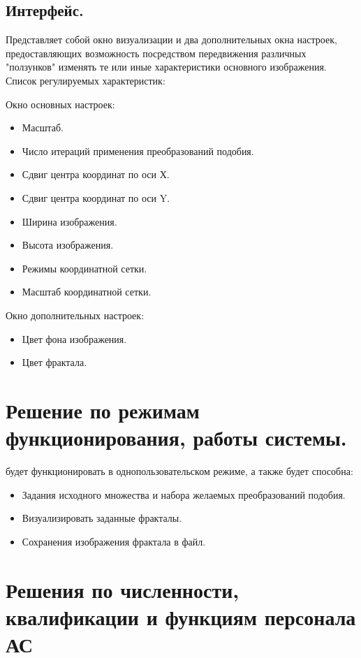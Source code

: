 \documentclass[a4paper,12pt,preview]{report} %
\begin{document}
	\subsection{Интерфейс.}
	
	Представляет собой окно визуализации и два дополнительных окна настроек, предоставляющих возможность посредством передвижения различных "ползунков" изменять те или иные характеристики основного изображения. Список регулируемых характеристик:
	
	Окно основных настроек:
	
	\begin{itemize}
		\item Масштаб.
		\item Число итераций применения преобразований подобия.
		\item Сдвиг центра координат по оси Х.
		\item Сдвиг центра координат по оси Y.
		\item Ширина изображения.
		\item Высота изображения.
		\item Режимы координатной сетки.
		\item Масштаб координатной сетки.
	\end{itemize}
	
	Окно дополнительных настроек:
	
	\begin{itemize}
		\item Цвет фона изображения.
		\item Цвет фрактала.
	\end{itemize}
	
	
	\section{Решение по режимам функционирования, работы системы.}
	
	будет функционировать в однопользовательском режиме, а также будет способна:
	
	\begin{itemize}
		\item Задания исходного множества и набора желаемых преобразований подобия.
		\item Визуализировать заданные фракталы.
		\item Сохранения изображения фрактала в файл.
	\end{itemize}
	
	\section{Решения по численности, квалификации и функциям персонала АС}
	
\end{document}
